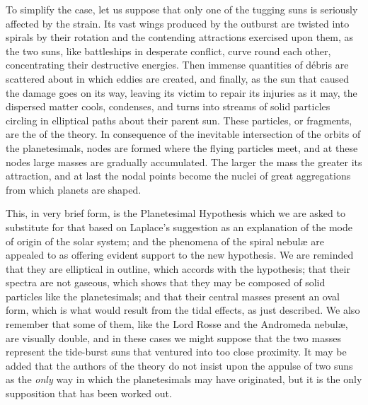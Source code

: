 To simplify the case, let us suppose that only one of the tugging suns
is seriously affected by the strain. Its vast wings produced by the
outburst are twisted into spirals by their rotation and the contending
attractions exercised upon them, as the two suns, like battleships in
desperate conflict, curve round each other, concentrating their
destructive energies. Then immense quantities of d{\'e}bris are scattered
about in which eddies are created, and finally, as the sun that caused
the damage goes on its way, leaving its victim to repair its injuries
as it may, the dispersed matter cools, condenses, and turns into
streams of solid particles circling in elliptical paths about their
parent sun. These particles, or fragments, are the
 of the theory. In consequence of the inevitable
intersection of the orbits of the planetesimals, nodes are formed
where the flying particles meet, and at these nodes large masses are
gradually accumulated. The larger the mass the greater its attraction,
and at last the nodal points become the nuclei of great aggregations
from which planets are shaped. 

This, in very brief form, is the Planetesimal Hypothesis which we are
asked to substitute for that based on Laplace's suggestion as an
explanation of the mode of origin of the solar system; and the
phenomena of the spiral nebul{\ae} are appealed to as offering evident
support to the new hypothesis. We are reminded that they are
elliptical in outline, which accords with the hypothesis; that their
spectra are not gaseous, which shows that they may be composed of
solid particles like the planetesimals; and that their central masses
present an oval form, which is what would result from the tidal
effects, as just described. We also remember that some of them, like
the Lord Rosse and the 
Andromeda nebul{\ae}, are visually double, and
in these cases we might suppose that the two masses represent the
tide-burst suns that ventured into too close proximity. It may be
added that the authors of the theory do not insist upon the appulse of
two suns as the {\em only} way in which the planetesimals may have
originated, but it is the only supposition that has been worked out.

